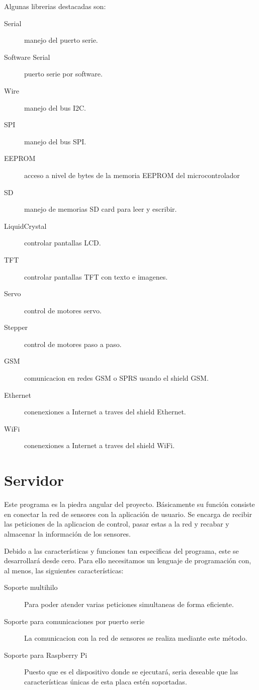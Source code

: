 Algunas librerias destacadas son:
\begin{description}
    \item[Serial] manejo del puerto serie.
    \item[Software Serial] puerto serie por software.
    \item[Wire] manejo del bus I2C.
    \item[SPI] manejo del bus SPI.
    \item[EEPROM] acceso a nivel de bytes de la memoria EEPROM del microcontrolador
    \item[SD] manejo de memorias SD card para leer y escribir.
    \item[LiquidCrystal] controlar pantallas LCD.
    \item[TFT] controlar pantallas TFT con texto e imagenes.
    \item[Servo] control de motores servo.
    \item[Stepper] control de motores paso a paso.
    \item[GSM] comunicacion en redes GSM o SPRS usando el shield GSM.
    \item[Ethernet] conenexiones a Internet a traves del shield Ethernet.
    \item[WiFi] conenexiones a Internet a traves del shield WiFi.
\end{description}


\section{Servidor}
Este programa es la piedra angular del proyecto. Básicamente su función consiste en conectar la red de sensores con la aplicación de usuario. Se encarga de recibir las peticiones de la aplicacion de control, pasar estas a la red y recabar y almacenar la información de los sensores. 

Debido a las características y funciones tan especificas del programa, este se desarrollará desde cero. Para ello necesitamos un lenguaje de programación con, al menos, las siguientes características:
\begin{description}
    \item[Soporte multihilo] Para poder atender varias peticiones simultaneas de forma eficiente.
    \item[Soporte para comunicaciones por puerto serie] La comunicacion con la red de sensores se realiza mediante este método.
    \item[Soporte para Raspberry Pi] Puesto que es el dispositivo donde se ejecutará, seria deseable que las características únicas de esta placa estén soportadas.
 \end{description}
 
